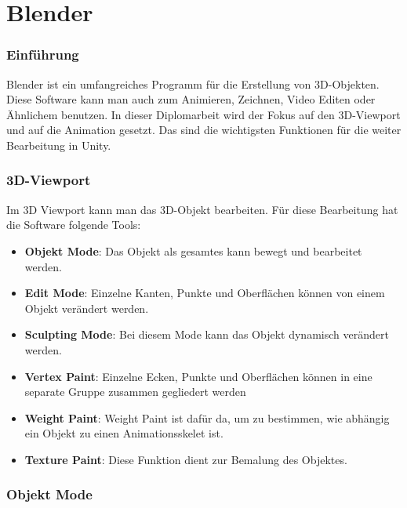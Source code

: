 \pagebreak
{}
\chapter{Blender}

\subsection{Einführung}
Blender ist ein umfangreiches Programm für die Erstellung von 3D-Objekten. Diese Software kann man auch zum Animieren, Zeichnen, Video Editen oder Ähnlichem benutzen. 
In dieser Diplomarbeit wird der Fokus auf den 3D-Viewport und auf die Animation gesetzt. Das sind die wichtigsten Funktionen für die weiter Bearbeitung in Unity. 

\subsection{3D-Viewport}
Im 3D Viewport kann man das 3D-Objekt bearbeiten. Für diese Bearbeitung hat die Software folgende Tools: 

\begin{itemize}
    \item \textbf{Objekt Mode}:
    \indent Das Objekt als gesamtes kann bewegt und bearbeitet werden. 
    \item \textbf{Edit Mode}:
    \indent Einzelne Kanten, Punkte und Oberflächen können von einem Objekt verändert werden. 
    \item \textbf{Sculpting Mode}:
    \indent Bei diesem Mode kann das Objekt dynamisch verändert werden.
    \item \textbf{Vertex Paint}:
    \indent Einzelne Ecken, Punkte und Oberflächen können in eine separate Gruppe zusammen gegliedert werden
    \item \textbf{Weight Paint}: 
    \indent Weight Paint ist dafür da, um zu bestimmen, wie abhängig ein Objekt zu einen Animationsskelet ist. 
    \item \textbf{Texture Paint}:
    \indent Diese Funktion dient zur Bemalung des Objektes.
\end{itemize}

\pagebreak

\subsection{Objekt Mode}

